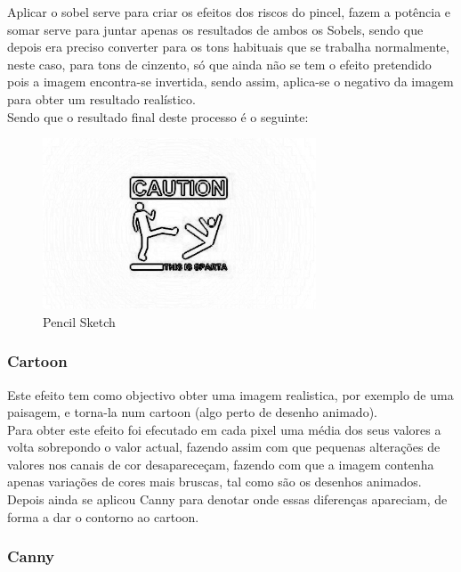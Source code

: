 \documentclass[portugues,final]{revdetua}
\begin{document}
Aplicar o sobel serve para criar os efeitos dos riscos do pincel, fazem a potência e somar serve para juntar apenas os resultados de ambos os Sobels, sendo que depois era preciso converter para os tons habituais que se trabalha normalmente, neste caso, para tons de cinzento, só que ainda não se tem o efeito pretendido pois a imagem encontra-se invertida, sendo assim, aplica-se o negativo da imagem para obter um resultado realístico.\\

Sendo que o resultado final deste processo é o seguinte:

\begin{figure}[H]
\centerline{\includegraphics[width=230pt]{images/pencil.jpeg}}
\caption{Pencil Sketch}
\label{img:complete}
\end{figure}

\subsubsection{Cartoon}

Este efeito tem como objectivo obter uma imagem realistica, por exemplo de uma paisagem, e torna-la num cartoon (algo perto de desenho animado).\\

Para obter este efeito foi efecutado em cada pixel uma média dos seus valores a volta sobrepondo o valor actual\cite{seg}, fazendo assim com que pequenas alterações de valores nos canais de cor desapareceçam, fazendo com que a imagem contenha apenas variações de cores mais bruscas, tal como são os desenhos animados.\\

Depois ainda se aplicou Canny para denotar onde essas diferenças apareciam, de forma a dar o contorno ao cartoon.

\subsubsection{Canny}
\end{document}
